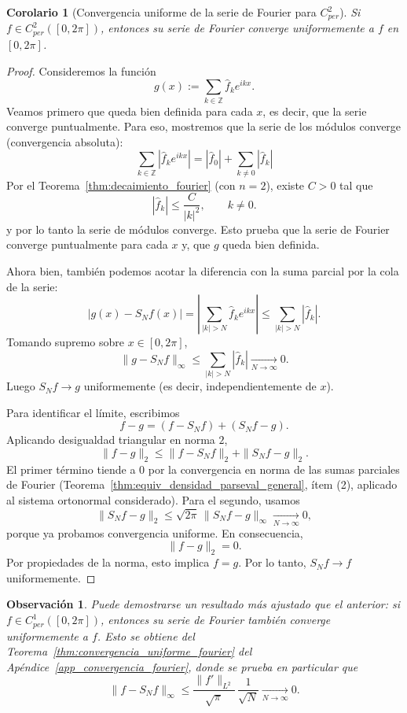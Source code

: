 \documentclass[a4paper,11pt]{report}
\newtheorem{corollary}[theorem]{Corolario}
\newtheorem{remark}[theorem]{Observación}
\begin{document}
\begin{corollary}[Convergencia uniforme de la serie de Fourier para $C^2_{per}$]\label{cor:conv_uniforme_c2_per}
Si $f\in C^2_{per}([0,2\pi])$, entonces su serie de Fourier converge uniformemente a $f$ en $[0,2\pi]$.
\end{corollary}

\begin{proof}
Consideremos la función
\[
g(x):=\sum_{k\in\mathbb Z}\hat f_k e^{ikx}.
\]
Veamos primero que queda bien definida para cada $x$, es decir, que la serie converge puntualmente. Para eso, mostremos que la serie de los módulos converge (convergencia absoluta): 
\[
\sum_{k\in\mathbb Z}|\hat f_k e^{ikx}|
=|\hat f_0|+\sum_{k\neq 0}|\hat f_k|
\]
Por el Teorema~\ref{thm:decaimiento_fourier} (con $n=2$), existe $C>0$ tal que
\[
|\hat f_k|\le \frac{C}{|k|^2},\qquad k\neq 0.
\]
y por lo tanto la serie de m\'odulos converge. Esto prueba que la serie de Fourier converge puntualmente para cada $x$ y, que $g$ queda bien definida.

Ahora bien, tambi\'en podemos acotar la diferencia con la suma parcial por la cola de la serie:
\[
|g(x)-S_Nf(x)|
=\left|\sum_{|k|>N}\hat f_k e^{ikx}\right|
\le \sum_{|k|>N}|\hat f_k|.
\]
Tomando supremo sobre $x\in[0,2\pi]$,
\[
\|g-S_Nf\|_\infty\le \sum_{|k|>N}|\hat f_k|\xrightarrow[N\to\infty]{}0.
\]
Luego $S_Nf\to g$ uniformemente (es decir, independientemente de $x$). 

Para identificar el l\'imite, escribimos
\[
f-g=(f-S_Nf)+(S_Nf-g).
\]
Aplicando desigualdad triangular en norma $2$,
\[
\|f-g\|_2\le \|f-S_Nf\|_2+\|S_Nf-g\|_2.
\]
El primer t\'ermino tiende a $0$ por la convergencia en norma de las sumas parciales de Fourier (Teorema~\ref{thm:equiv_densidad_parseval_general}, ítem (2), aplicado al sistema ortonormal considerado). Para el segundo, usamos
\[
\|S_Nf-g\|_2\le \sqrt{2\pi}\,\|S_Nf-g\|_\infty\xrightarrow[N\to\infty]{}0,
\]
porque ya probamos convergencia uniforme. En consecuencia,
\[
\|f-g\|_2=0.
\]
Por propiedades de la norma, esto implica $f=g$. Por lo tanto, $S_Nf\to f$ uniformemente.
\end{proof}

\begin{remark}
Puede demostrarse un resultado más ajustado que el anterior: si
\(f\in C^1_{per}([0,2\pi])\), entonces su serie de Fourier tambi\'en
converge uniformemente a \(f\). Esto se obtiene del
Teorema~\ref{thm:convergencia_uniforme_fourier} del
Ap\'endice~\ref{app_convergencia_fourier}, donde se prueba
en particular que
\[
\|f-S_Nf\|_\infty \le \frac{\|f'\|_{L^2}}{\sqrt{\pi}}\,\frac{1}{\sqrt{N}}
\xrightarrow[N\to\infty]{}0.
\]
\end{remark}
\end{document}
